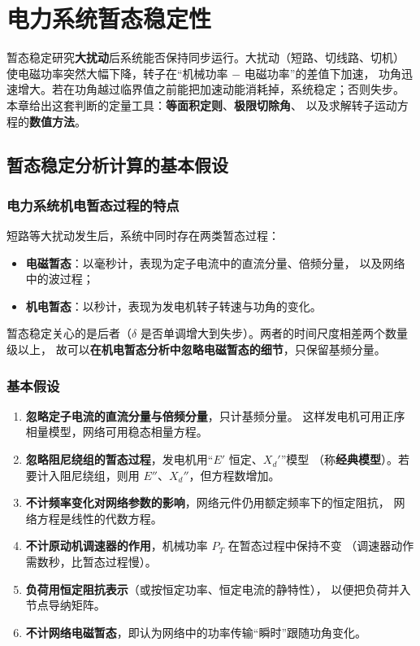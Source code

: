 
\chapter{电力系统暂态稳定性}

暂态稳定研究\textbf{大扰动}后系统能否保持同步运行。大扰动（短路、切线路、切机）
使电磁功率突然大幅下降，转子在“机械功率 $-$ 电磁功率”的差值下加速，
功角迅速增大。若在功角越过临界值之前能把加速动能消耗掉，系统稳定；否则失步。
本章给出这套判断的定量工具：\textbf{等面积定则}、\textbf{极限切除角}、
以及求解转子运动方程的\textbf{数值方法}。

\section{暂态稳定分析计算的基本假设}

\subsection{电力系统机电暂态过程的特点}

短路等大扰动发生后，系统中同时存在两类暂态过程：
\begin{itemize}
  \item \textbf{电磁暂态}：以毫秒计，表现为定子电流中的直流分量、倍频分量，
        以及网络中的波过程；
  \item \textbf{机电暂态}：以秒计，表现为发电机转子转速与功角的变化。
\end{itemize}
暂态稳定关心的是后者（$\delta$ 是否单调增大到失步）。两者的时间尺度相差两个数量级以上，
故可以\textbf{在机电暂态分析中忽略电磁暂态的细节}，只保留基频分量。

\subsection{基本假设}

\begin{enumerate}
  \item \textbf{忽略定子电流的直流分量与倍频分量}，只计基频分量。
        这样发电机可用正序相量模型，网络可用稳态相量方程。
  \item \textbf{忽略阻尼绕组的暂态过程}，发电机用“$E'$ 恒定、$X_d'$”模型
        （称\textbf{经典模型}）。若要计入阻尼绕组，则用 $E''$、$X_d''$，但方程数增加。
  \item \textbf{不计频率变化对网络参数的影响}，网络元件仍用额定频率下的恒定阻抗，
        网络方程是线性的代数方程。
  \item \textbf{不计原动机调速器的作用}，机械功率 $P_T$ 在暂态过程中保持不变
        （调速器动作需数秒，比暂态过程慢）。
  \item \textbf{负荷用恒定阻抗表示}（或按恒定功率、恒定电流的静特性），
        以便把负荷并入节点导纳矩阵。
  \item \textbf{不计网络电磁暂态}，即认为网络中的功率传输“瞬时”跟随功角变化。
\end{enumerate}

